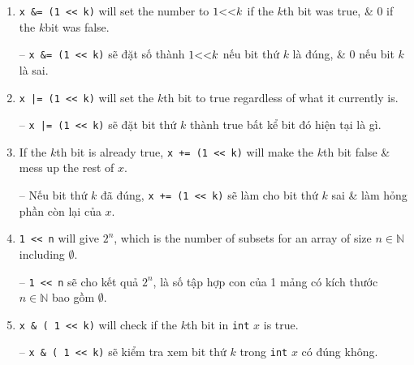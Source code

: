 \documentclass{article}
\begin{document}
\begin{enumerate}
    \item \verb|x &= (1 << k)| will set the number to $1{\tt<<}k$ if the $k$th bit was true, \& 0 if the $k$bit was false.

    -- \verb|x &= (1 << k)| sẽ đặt số thành $1{\tt<<}k$ nếu bit thứ $k$ là đúng, \& 0 nếu bit $k$ là sai.

    \item \verb!x |= (1 << k)! will set the $k$th bit to true regardless of what it currently is.

    -- \verb!x |= (1 << k)! sẽ đặt bit thứ $k$ thành true bất kể bit đó hiện tại là gì.

    \item If the $k$th bit is already true, \verb|x += (1 << k)| will make the $k$th bit false \& mess up the rest of $x$.

    -- Nếu bit thứ $k$ đã đúng, \verb|x += (1 << k)| sẽ làm cho bit thứ $k$ sai \& làm hỏng phần còn lại của $x$.

    \item \verb|1 << n| will give $2^n$, which is the number of subsets for an array of size $n\in\mathbb{N}$ including $\emptyset$.

    -- \verb|1 << n| sẽ cho kết quả $2^n$, là số tập hợp con của 1 mảng có kích thước $n\in\mathbb{N}$ bao gồm $\emptyset$.

    \item \verb|x & ( 1 << k)| will check if the $k$th bit in {\tt int} $x$ is true.

    -- \verb|x & ( 1 << k)| sẽ kiểm tra xem bit thứ $k$ trong {\tt int} $x$ có đúng không.
\end{enumerate}

\end{document}
